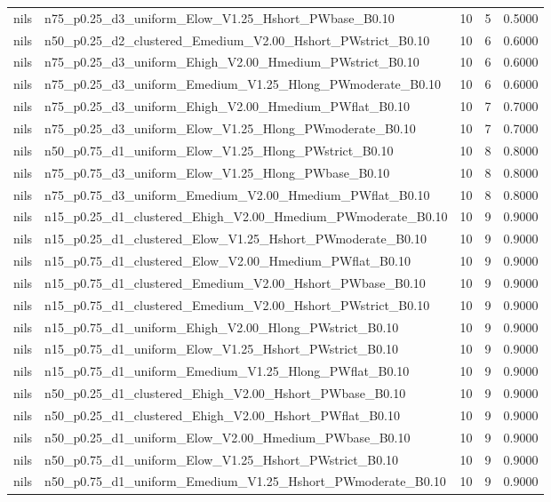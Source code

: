 \begin{tabular}{llrrr}
nils & n75_p0.25_d3_uniform_Elow_V1.25_Hshort_PWbase_B0.10 & 10 & 5 & 0.5000 \\
nils & n50_p0.25_d2_clustered_Emedium_V2.00_Hshort_PWstrict_B0.10 & 10 & 6 & 0.6000 \\
nils & n75_p0.25_d3_uniform_Ehigh_V2.00_Hmedium_PWstrict_B0.10 & 10 & 6 & 0.6000 \\
nils & n75_p0.25_d3_uniform_Emedium_V1.25_Hlong_PWmoderate_B0.10 & 10 & 6 & 0.6000 \\
nils & n75_p0.25_d3_uniform_Ehigh_V2.00_Hmedium_PWflat_B0.10 & 10 & 7 & 0.7000 \\
nils & n75_p0.25_d3_uniform_Elow_V1.25_Hlong_PWmoderate_B0.10 & 10 & 7 & 0.7000 \\
nils & n50_p0.75_d1_uniform_Elow_V1.25_Hlong_PWstrict_B0.10 & 10 & 8 & 0.8000 \\
nils & n75_p0.75_d3_uniform_Elow_V1.25_Hlong_PWbase_B0.10 & 10 & 8 & 0.8000 \\
nils & n75_p0.75_d3_uniform_Emedium_V2.00_Hmedium_PWflat_B0.10 & 10 & 8 & 0.8000 \\
nils & n15_p0.25_d1_clustered_Ehigh_V2.00_Hmedium_PWmoderate_B0.10 & 10 & 9 & 0.9000 \\
nils & n15_p0.25_d1_clustered_Elow_V1.25_Hshort_PWmoderate_B0.10 & 10 & 9 & 0.9000 \\
nils & n15_p0.75_d1_clustered_Elow_V2.00_Hmedium_PWflat_B0.10 & 10 & 9 & 0.9000 \\
nils & n15_p0.75_d1_clustered_Emedium_V2.00_Hshort_PWbase_B0.10 & 10 & 9 & 0.9000 \\
nils & n15_p0.75_d1_clustered_Emedium_V2.00_Hshort_PWstrict_B0.10 & 10 & 9 & 0.9000 \\
nils & n15_p0.75_d1_uniform_Ehigh_V2.00_Hlong_PWstrict_B0.10 & 10 & 9 & 0.9000 \\
nils & n15_p0.75_d1_uniform_Elow_V1.25_Hshort_PWstrict_B0.10 & 10 & 9 & 0.9000 \\
nils & n15_p0.75_d1_uniform_Emedium_V1.25_Hlong_PWflat_B0.10 & 10 & 9 & 0.9000 \\
nils & n50_p0.25_d1_clustered_Ehigh_V2.00_Hshort_PWbase_B0.10 & 10 & 9 & 0.9000 \\
nils & n50_p0.25_d1_clustered_Ehigh_V2.00_Hshort_PWflat_B0.10 & 10 & 9 & 0.9000 \\
nils & n50_p0.25_d1_uniform_Elow_V2.00_Hmedium_PWbase_B0.10 & 10 & 9 & 0.9000 \\
nils & n50_p0.75_d1_uniform_Elow_V1.25_Hshort_PWstrict_B0.10 & 10 & 9 & 0.9000 \\
nils & n50_p0.75_d1_uniform_Emedium_V1.25_Hshort_PWmoderate_B0.10 & 10 & 9 & 0.9000 \\

\end{tabular}
